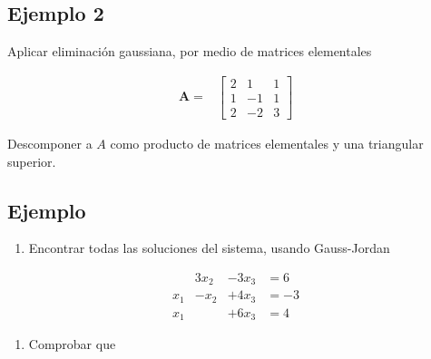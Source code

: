 \documentclass[
]{article}
\providecommand{\tightlist}{%
  \setlength{\itemsep}{0pt}\setlength{\parskip}{0pt}}
\begin{document}
\hypertarget{ejemplo-2-3}{%
\subsection{Ejemplo 2}\label{ejemplo-2-3}}

Aplicar eliminación gaussiana, por medio de matrices elementales

\begin{equation*}
\begin{array}{cc}
\mathbf{A}  =&  \begin{bmatrix} 2 &  1 & 1 \\
                                1 & -1 & 1 \\
                                2 & -2 & 3
                 \end{bmatrix}
\end{array}
\end{equation*}

Descomponer a \(A\) como producto de matrices elementales y una
triangular superior.

\hypertarget{ejemplo-7}{%
\subsection{Ejemplo}\label{ejemplo-7}}

\begin{enumerate}
\def\labelenumi{\arabic{enumi}.}
\tightlist
\item
  Encontrar todas las soluciones del sistema, usando Gauss-Jordan
\end{enumerate}

\begin{equation*}
  \begin{matrix}
            &  3 x_2 &- 3 x_3  & = 6  \\
      x_1  &  -x_2 & +  4x_3  & = -3   \\
      x_1   &      &  +6 x_3  & =4
  \end{matrix}
\end{equation*}

\begin{enumerate}
\def\labelenumi{\arabic{enumi}.}
\setcounter{enumi}{1}
\tightlist
\item
  Comprobar que
\end{enumerate}
\end{document}
